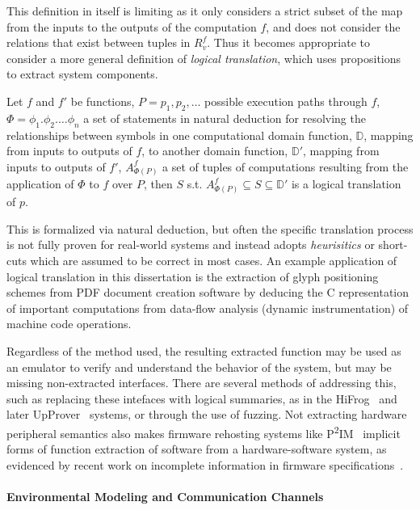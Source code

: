 This definition in itself is limiting as it only considers a strict subset of the map from the inputs to the outputs of the computation $f$, and does not consider the relations that exist between tuples in $R_{v}^{f}$.
Thus it becomes appropriate to consider a more general definition of \emph{logical translation}, which uses propositions to extract system components.

\begin{definition}
\label{def:nested-summarization}
	Let $f$ and $f'$ be functions, $P = p_{1}, p_{2}, \dots $ possible
	execution paths through $f$, $\Phi = \phi_{1} . \phi_{2} . \dots
	\phi_{n}$ a set of statements in natural deduction for resolving the
	relationships between symbols in one computational domain function,
	$\mathbb{D}$, mapping from inputs to outputs of $f$, to another domain
	function, $\mathbb{D}'$, mapping from inputs to outputs of $f'$,
	$A_{\Phi(P)}^{f}$ a set of tuples of computations resulting from the
	application of $\Phi$ to $f$ over $P$, then $S$ s.t. $A_{\Phi(P)}^{f}
	\subseteq S \subseteq \mathbb{D}'$ is a logical translation of
	$p$.
\end{definition}

This is formalized via natural deduction, but often the specific translation process is not fully proven for real-world systems and instead adopts \emph{heurisitics} or short-cuts which are assumed to be correct in most cases.
An example application of logical translation in this dissertation is the extraction of glyph positioning schemes from PDF document creation software by deducing the C representation of important computations from data-flow analysis (dynamic instrumentation) of machine code operations.

Regardless of the method used, the resulting extracted function may be used as an emulator to verify and understand the behavior of the system, but may be missing non-extracted interfaces.
There are several methods of addressing this, such as replacing these intefaces with logical summaries, as in the HiFrog~\cite{hifrog} and later UpProver~\cite{upprover} systems, or through the use of fuzzing.
Not extracting hardware peripheral semantics also makes firmware rehosting systems like P\textsuperscript{2}IM~\cite{p2im2020} implicit forms of function extraction of software from a hardware-software system, as evidenced by recent work on incomplete information in firmware specifications~\cite{zhou2022your}.

\paragraph{Environmental Modeling and Communication Channels}

